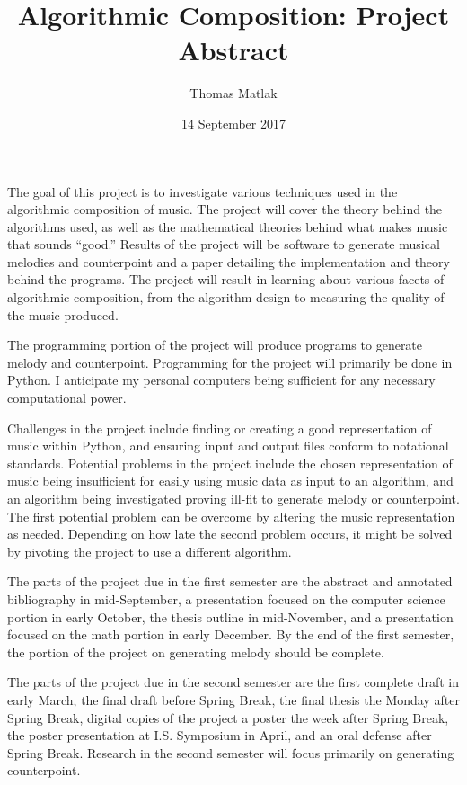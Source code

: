 \documentclass[12pt]{article}
\title{Algorithmic Composition: Project Abstract}
\author{Thomas Matlak}
\date{14 September 2017}
\begin{document}
	\maketitle
	
	The goal of this project is to investigate various techniques used in the algorithmic composition of music. The project will cover the theory behind the algorithms used, as well as the mathematical theories behind what makes music that sounds ``good.'' Results of the project will be software to generate musical melodies and counterpoint and a paper detailing the implementation and theory behind the programs. The project will result in learning about various facets of algorithmic composition, from the algorithm design to measuring the quality of the music produced.
	
	The programming portion of the project will produce programs to generate melody and counterpoint. Programming for the project will primarily be done in Python. I anticipate my personal computers being sufficient for any necessary computational power.
	
	Challenges in the project include finding or creating a good representation of music within Python, and ensuring input and output files conform to notational standards. Potential problems in the project include the chosen representation of music being insufficient for easily using music data as input to an algorithm, and an algorithm being investigated proving ill-fit to generate melody or counterpoint. The first potential problem can be overcome by altering the music representation as needed. Depending on how late the second problem occurs, it might be solved by pivoting the project to use a different algorithm.
	
	The parts of the project due in the first semester are the abstract and annotated bibliography in mid-September, a presentation focused on the computer science portion in early October, the thesis outline in mid-November, and a presentation focused on the math portion in early December. By the end of the first semester, the portion of the project on generating melody should be complete.
	
	The parts of the project due in the second semester are the first complete draft in early March, the final draft before Spring Break, the final thesis the Monday after Spring Break, digital copies of the project a poster the week after Spring Break, the poster presentation at I.S. Symposium in April, and an oral defense after Spring Break. Research in the second semester will focus primarily on generating counterpoint.
	
	\nocite{*}
	
	
	
\end{document}
